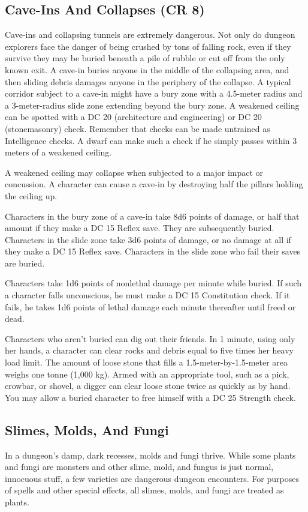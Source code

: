 \subsection{Cave-Ins And Collapses (CR 8)}
Cave-ins and collapsing tunnels are extremely dangerous. Not only do dungeon explorers face the danger of being crushed by tons of falling rock, even if they survive they may be buried beneath a pile of rubble or cut off from the only known exit. A cave-in buries anyone in the middle of the collapsing area, and then sliding debris damages anyone in the periphery of the collapse. A typical corridor subject to a cave-in might have a bury zone with a 4.5-meter radius and a 3-meter-radius slide zone extending beyond the bury zone. A weakened ceiling can be spotted with a DC 20  (architecture and engineering) or DC 20  (stonemasonry) check. Remember that  checks can be made untrained as Intelligence checks. A dwarf can make such a check if he simply passes within 3 meters of a weakened ceiling.

A weakened ceiling may collapse when subjected to a major impact or concussion. A character can cause a cave-in by destroying half the pillars holding the ceiling up.

Characters in the bury zone of a cave-in take 8d6 points of damage, or half that amount if they make a DC 15 Reflex save. They are subsequently buried. Characters in the slide zone take 3d6 points of damage, or no damage at all if they make a DC 15 Reflex save. Characters in the slide zone who fail their saves are buried.

Characters take 1d6 points of nonlethal damage per minute while buried. If such a character falls unconscious, he must make a DC 15 Constitution check. If it fails, he takes 1d6 points of lethal damage each minute thereafter until freed or dead.

Characters who aren't buried can dig out their friends. In 1 minute, using only her hands, a character can clear rocks and debris equal to five times her heavy load limit. The amount of loose stone that fills a 1.5-meter-by-1.5-meter area weighs one tonne (1,000 kg). Armed with an appropriate tool, such as a pick, crowbar, or shovel, a digger can clear loose stone twice as quickly as by hand. You may allow a buried character to free himself with a DC 25 Strength check.

\subsection{Slimes, Molds, And Fungi}
In a dungeon's damp, dark recesses, molds and fungi thrive. While some plants and fungi are monsters and other slime, mold, and fungus is just normal, innocuous stuff, a few varieties are dangerous dungeon encounters. For purposes of spells and other special effects, all slimes, molds, and fungi are treated as plants.

